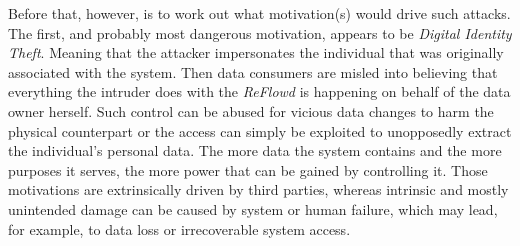 \documentclass[12pt,english,a4paper,titlepage,cleardoublepage=empty,dottedtoc]{report}
\begin{document}
Before that, however, is to work out what motivation(s) would drive such
attacks. The first, and probably most dangerous motivation, appears to
be \emph{Digital Identity Theft}. Meaning that the attacker impersonates
the individual that was originally associated with the system. Then data
consumers are misled into believing that everything the intruder does
with the \emph{ReFlowd} is happening on behalf of the data owner
herself. Such control can be abused for vicious data changes to harm the
physical counterpart or the access can simply be exploited to
unopposedly extract the individual's personal data. The more data the
system contains and the more purposes it serves, the more power that can
be gained by controlling it. Those motivations are extrinsically driven
by third parties, whereas intrinsic and mostly unintended damage can be
caused by system or human failure, which may lead, for example, to data
loss or irrecoverable system access.
\end{document}
